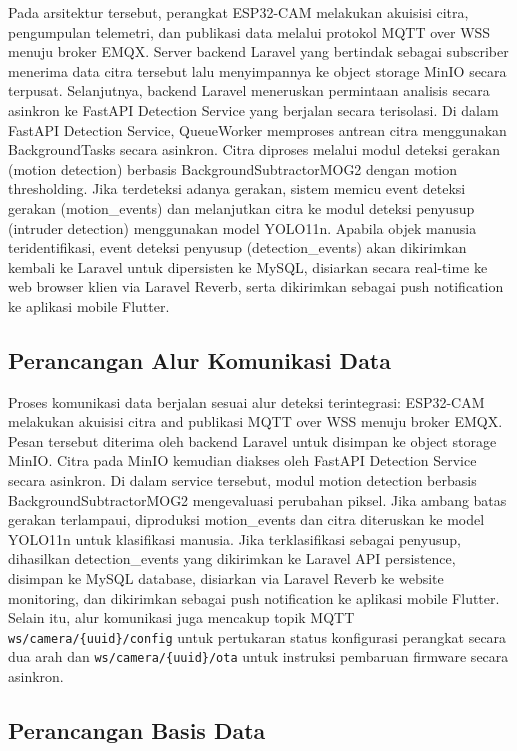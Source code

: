 Pada arsitektur tersebut, perangkat ESP32-CAM melakukan akuisisi citra, pengumpulan telemetri, dan publikasi data melalui protokol MQTT over WSS menuju broker EMQX. Server backend Laravel yang bertindak sebagai subscriber menerima data citra tersebut lalu menyimpannya ke object storage MinIO secara terpusat. Selanjutnya, backend Laravel meneruskan permintaan analisis secara asinkron ke FastAPI Detection Service yang berjalan secara terisolasi. Di dalam FastAPI Detection Service, QueueWorker memproses antrean citra menggunakan BackgroundTasks secara asinkron. Citra diproses melalui modul deteksi gerakan (motion detection) berbasis BackgroundSubtractorMOG2 dengan motion thresholding. Jika terdeteksi adanya gerakan, sistem memicu event deteksi gerakan (motion\_events) dan melanjutkan citra ke modul deteksi penyusup (intruder detection) menggunakan model YOLO11n. Apabila objek manusia teridentifikasi, event deteksi penyusup (detection\_events) akan dikirimkan kembali ke Laravel untuk dipersisten ke MySQL, disiarkan secara real-time ke web browser klien via Laravel Reverb, serta dikirimkan sebagai push notification ke aplikasi mobile Flutter.

\subsection{Perancangan Alur Komunikasi Data}

Proses komunikasi data berjalan sesuai alur deteksi terintegrasi: ESP32-CAM melakukan akuisisi citra and publikasi MQTT over WSS menuju broker EMQX. Pesan tersebut diterima oleh backend Laravel untuk disimpan ke object storage MinIO. Citra pada MinIO kemudian diakses oleh FastAPI Detection Service secara asinkron. Di dalam service tersebut, modul motion detection berbasis BackgroundSubtractorMOG2 mengevaluasi perubahan piksel. Jika ambang batas gerakan terlampaui, diproduksi motion\_events dan citra diteruskan ke model YOLO11n untuk klasifikasi manusia. Jika terklasifikasi sebagai penyusup, dihasilkan detection\_events yang dikirimkan ke Laravel API persistence, disimpan ke MySQL database, disiarkan via Laravel Reverb ke website monitoring, dan dikirimkan sebagai push notification ke aplikasi mobile Flutter. Selain itu, alur komunikasi juga mencakup topik MQTT \texttt{ws/camera/\{uuid\}/config} untuk pertukaran status konfigurasi perangkat secara dua arah dan \texttt{ws/camera/\{uuid\}/ota} untuk instruksi pembaruan firmware secara asinkron.

\subsection{Perancangan Basis Data}

